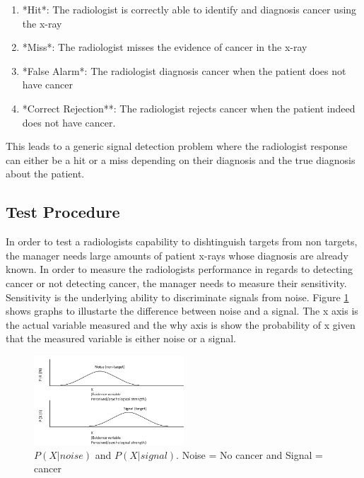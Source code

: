 \documentclass[12pt]{article}
\begin{document}
	\begin{enumerate}
		\item *Hit*: The radiologist is correctly able to identify and diagnosis cancer using the x-ray
		\item *Miss*: The radiologist misses the evidence of cancer in the x-ray
		\item *False Alarm*: The radiologist diagnosis cancer when the patient does not have cancer
		\item *Correct Rejection**: The radiologist rejects cancer when the patient indeed does not have cancer.
	\end{enumerate}
	
	This leads to a generic signal detection problem where the radiologist response can either be a hit or a miss depending on their diagnosis and the true diagnosis about the patient.
	
	
	
	\subsection{Test Procedure}
	In order to test a radiologists capability to dishtinguish targets from non targets, the manager needs large amounts of patient x-rays whose diagnosis are already known. In order to measure the radiologists performance in regards to detecting cancer or not detecting cancer, the manager needs to measure their sensitivity. Sensitivity is the underlying ability to discriminate signals from noise. Figure \ref{sensitivity-graph1} shows graphs to illustarte the difference between noise and a signal. The x axis is the actual variable measured and the why axis is show the probability of x given that the measured variable is either noise or a signal.
	
	\begin{figure}[!ht]
		\centering
		\includegraphics[width=0.5\textwidth]{sensitivity-graph1}
		\caption{$P(X|noise)$ and $P(X|signal)$. Noise = No cancer and Signal = cancer}
		\label{sensitivity-graph1}
	\end{figure}
	
\end{document}

